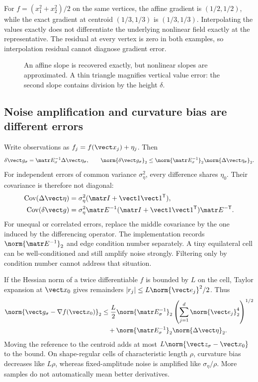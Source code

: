 For $f=(x_1^2+x_2^2)/2$ on the same vertices, the affine gradient is
$(1/2,1/2)$, while the exact gradient at centroid $(1/3,1/3)$ is
$(1/3,1/3)$. Interpolating the values exactly does not differentiate the
underlying nonlinear field exactly at the representative. The residual at
every vertex is zero in both examples, so interpolation residual cannot
diagnose gradient error.

\begin{figure}[htbp]
\centering
\caption{An affine slope is recovered exactly, but nonlinear slopes are
approximated. A thin triangle magnifies vertical value error: the second
slope contains division by the height $\delta$.}
\label{fig:simplex}
\end{figure}

\subsection{Noise amplification and curvature bias are different errors}
Write observations as $f_j=f(\vect x_j)+\eta_j$. Then
\begin{equation}
 \delta\vect g_\sigma=\matr E_\sigma^{-1}\Delta\vect\eta_\sigma,
 \qquad
 \norm{\delta\vect g_\sigma}_2\leq
 \norm{\matr E_\sigma^{-1}}_2\norm{\Delta\vect\eta_\sigma}_2.
 \label{eq:noisebound}
\end{equation}
For independent errors of common variance $\sigma_\eta^2$, every difference
shares $\eta_0$. Their covariance is therefore not diagonal:
\begin{align}
 \operatorname{Cov}(\Delta\vect\eta)&=
 \sigma_\eta^2(\matr I+\vect 1\vect 1^{\mathsf T}),\\
 \operatorname{Cov}(\delta\vect g)&=\sigma_\eta^2
 \matr E^{-1}(\matr I+\vect1\vect1^{\mathsf T})\matr E^{-\mathsf T}.
 \label{eq:covariance}
\end{align}
For unequal or correlated errors, replace the middle covariance by the one
induced by the differencing operator. The implementation records
$\norm{\matr E^{-1}}_2$ and edge condition number separately. A tiny
equilateral cell can be well-conditioned and still amplify noise strongly.
Filtering only by condition number cannot address that situation.

If the Hessian norm of a twice differentiable $f$ is bounded by $L$ on the
cell, Taylor expansion at $\vect x_0$ gives remainders
$|r_j|\leq L\norm{\vect e_j}^2/2$. Thus
\begin{align}
 \norm{\vect g_\sigma-\nabla f(\vect x_0)}_2
 &\leq \frac{L}{2}\norm{\matr E_\sigma^{-1}}_2
 \left(\sum_{j=1}^d\norm{\vect e_j}_2^4\right)^{1/2}\nonumber\\
 &\quad+\norm{\matr E_\sigma^{-1}}_2\norm{\Delta\vect\eta}_2.
 \label{eq:bias}
\end{align}
Moving the reference to the centroid adds at most
$L\norm{\vect z_\sigma-\vect x_0}$ to the bound. On shape-regular cells
of characteristic length $\rho$, curvature bias decreases like $L\rho$,
whereas fixed-amplitude noise is amplified like $\sigma_\eta/\rho$.
More samples do not automatically mean better derivatives.

